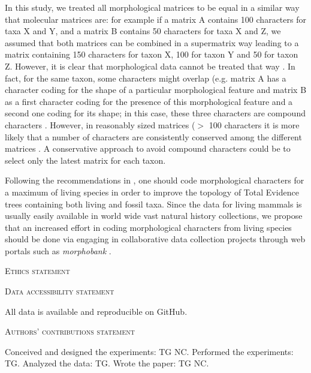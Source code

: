 \documentclass[12pt,letterpaper]{article}
\renewcommand{\section}[1]{%
\bigskip
\begin{center}
\begin{Large}
\normalfont\scshape #1
\medskip
\end{Large}
\end{center}}
\begin{document}
In this study, we treated all morphological matrices to be equal in a similar way that molecular matrices are: for example if a matrix A contains 100 characters for taxa X and Y, and a matrix B contains 50 characters for taxa X and Z, we assumed that both matrices can be combined in a supermatrix way leading to a matrix containing 150 characters for taxon X, 100 for taxon Y and 50 for taxon Z.
However, it is clear that morphological data cannot be treated that way \citep{Brazeau2011}.
In fact, for the same taxon, some characters might overlap (e.g.
matrix A has a character coding for the shape of a particular morphological feature and matrix B as a first character coding for the presence of this morphological feature and a second one coding for its shape; in this case, these three characters are compound characters \citep{Brazeau2011}.
However, in reasonably sized matrices ($>$ 100 characters \citep{GuillermeCooper,harrisonamong-character2014} it is more likely that a number of characters are consistently conserved among the different matrices \citep[e.g.][]{ross1998phylogenetic,seiffert2003fossil,marivaux2005anthropoid,seiffert2005basal,bloch2007new,kay2008anatomy,silcox2008biogeographic,seiffert2009convergent,tabuce2009anthropoid,boyer2010astragalar,seiffert2010fossil,marivaux2013djebelemur,ni2013oldest}.
A conservative approach to avoid compound characters could be to select only the latest matrix for each taxon.

Following the recommendations in \citep{GuillermeCooper}, one should code morphological characters for a maximum of living species in order to improve the topology of Total Evidence trees containing both living and fossil taxa.
Since the data for living mammals is usually easily available in world wide vast natural history collections, we propose that an increased effort in coding morphological characters from living species should be done via engaging in collaborative data collection projects through web portals such as \textit{morphobank} \citep{morphobank}.

\section{Ethics statement}
\section{Data accessibility statement}
All data is available and reproducible on GitHub.
\section{Authors’ contributions statement}
Conceived and designed the experiments: TG NC. Performed the experiments: TG. Analyzed the data: TG. Wrote the paper: TG NC.
\end{document}
